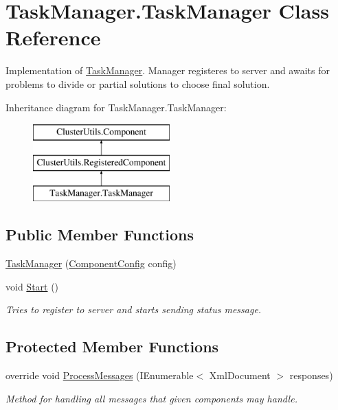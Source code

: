 \hypertarget{class_task_manager_1_1_task_manager}{}\section{Task\+Manager.\+Task\+Manager Class Reference}
\label{class_task_manager_1_1_task_manager}


Implementation of \hyperlink{class_task_manager_1_1_task_manager}{Task\+Manager}. Manager registeres to server and awaits for problems to divide or partial solutions to choose final solution.  


Inheritance diagram for Task\+Manager.\+Task\+Manager\+:\begin{figure}[H]
\begin{center}
\leavevmode
\includegraphics[height=3.000000cm]{class_task_manager_1_1_task_manager}
\end{center}
\end{figure}
\subsection*{Public Member Functions}
\begin{DoxyCompactItemize}
\item 
\hyperlink{class_task_manager_1_1_task_manager_af3c362713451d2f2f38fcf615140daa6}{Task\+Manager} (\hyperlink{class_cluster_utils_1_1_component_config}{Component\+Config} config)
\item 
void \hyperlink{class_task_manager_1_1_task_manager_afd66af2649a0a2e6747258b73853c4aa}{Start} ()
\begin{DoxyCompactList}\small\item\em Tries to register to server and starts sending status message. \end{DoxyCompactList}\end{DoxyCompactItemize}
\subsection*{Protected Member Functions}
\begin{DoxyCompactItemize}
\item 
override void \hyperlink{class_task_manager_1_1_task_manager_aaf525b63d8bb2d1a91ae794ebd016e5b}{Process\+Messages} (I\+Enumerable$<$ Xml\+Document $>$ responses)
\begin{DoxyCompactList}\small\item\em Method for handling all messages that given components may handle. \end{DoxyCompactList}\end{DoxyCompactItemize}
